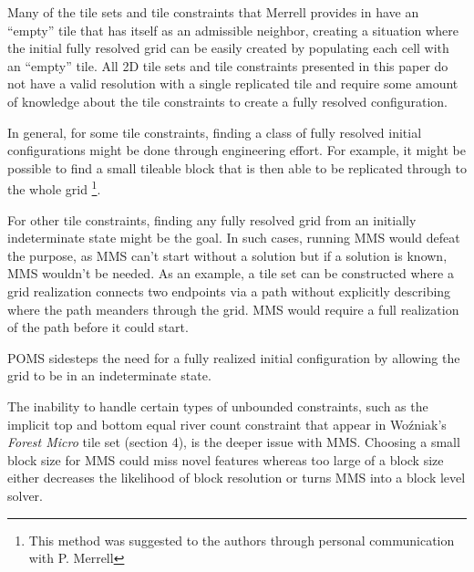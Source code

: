 Many of the tile sets and tile constraints that Merrell provides in \cite{Merrell_2007, Merrell_2009} have an ``empty'' tile that 
has itself as an admissible neighbor, creating a situation where the initial fully resolved grid can be easily created
by populating each cell with an ``empty'' tile.
All 2D tile sets and tile constraints presented in this paper do not have a valid resolution with a single replicated
tile and require some amount of knowledge about the tile constraints
to create a fully resolved configuration.

In general, for some tile constraints, finding a class of fully resolved initial configurations might be done through engineering effort.
For example, it might be possible to find a small tileable block that is then able to be replicated through to the whole grid
\footnote{ This method was suggested to the authors through personal communication with P. Merrell }.

For other tile constraints, finding any fully resolved grid from an initially indeterminate state might be the goal.
In such cases, running MMS would defeat the purpose, as MMS can't start without a solution but if a solution is known, MMS wouldn't
be needed.
As an example, a tile set can be constructed where a grid realization connects two endpoints via a path
without explicitly describing where the path meanders through the grid.
MMS would require a full realization of the path before it could start.


POMS sidesteps the need for a fully realized initial configuration by allowing the grid to be in an indeterminate state.


The inability to handle certain types of unbounded constraints, such as the implicit top and bottom equal river count constraint that appear in
Wo\'zniak's \textit{Forest Micro} tile set (section 4), is the deeper issue with MMS.
Choosing a small block size for MMS could miss novel features whereas too large of a block size either decreases
the likelihood of block resolution or turns MMS into a block level solver.


